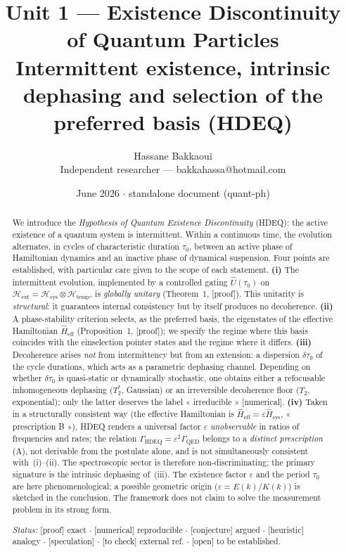 \documentclass[11pt,a4paper]{article}
\title{\textbf{Unit 1 --- Existence Discontinuity of Quantum Particles}\\[2pt]
\large Intermittent existence, intrinsic dephasing and selection of the preferred basis (HDEQ)}
\author{Hassane Bakkaoui\\ \small Independent researcher --- bakkahassa@hotmail.com}
\date{\small June 2026 $\cdot$ standalone document (quant-ph)}
\newcommand{\Hext}{\mathcal{H}_{\mathrm{ext}}}
\newcommand{\Hsys}{\mathcal{H}_{\mathrm{sys}}}
\newcommand{\Htemp}{\mathcal{H}_{\mathrm{temp}}}
\newcommand{\Hsysop}{\hat{H}_{\mathrm{sys}}}
\newcommand{\Heff}{\hat{H}_{\mathrm{eff}}}
\newcommand{\statut}[1]{{\footnotesize\textsf{[#1]}}}
\theoremstyle{plain}
\theoremstyle{definition}
\theoremstyle{remark}
\begin{document}
\maketitle

\begin{abstract}
\noindent
We introduce the \emph{Hypothesis of Quantum Existence Discontinuity} (HDEQ):
the active existence of a quantum system is intermittent. Within a continuous
time, the evolution alternates, in cycles of characteristic duration $\tau_0$,
between an active phase of Hamiltonian dynamics and an inactive phase of
dynamical suspension. Four points are established, with particular care given to
the scope of each statement.
\textbf{(i)} The intermittent evolution, implemented by a controlled gating
$\hat{U}(\tau_0)$ on $\Hext=\Hsys\otimes\Htemp$, is \emph{globally unitary}
(Theorem~1, \statut{proof}). This unitarity is \emph{structural}: it guarantees
internal consistency but by itself produces no decoherence.
\textbf{(ii)} A phase-stability criterion selects, as the preferred basis, the
eigenstates of the effective Hamiltonian $\Heff$ (Proposition~1, \statut{proof});
we specify the regime where this basis coincides with the einselection pointer
states and the regime where it differs.
\textbf{(iii)} Decoherence arises \emph{not} from intermittency but from an
extension: a dispersion $\delta\tau_0$ of the cycle durations, which acts as a
parametric dephasing channel. Depending on whether $\delta\tau_0$ is
quasi-static or dynamically stochastic, one obtains either a refocusable
inhomogeneous dephasing ($T_2^\ast$, Gaussian) or an irreversible decoherence
floor ($T_2$, exponential); only the latter deserves the label « irreducible »
\statut{numerical}.
\textbf{(iv)} Taken in a structurally consistent way (the effective Hamiltonian
is $\Heff=\varepsilon\Hsysop$, « prescription B »), HDEQ renders a universal
factor $\varepsilon$ \emph{unobservable} in ratios of frequencies and rates; the
relation $\Gamma_{\mathrm{HDEQ}}=\varepsilon^2\Gamma_{\mathrm{QED}}$ belongs to a
\emph{distinct prescription} (A), not derivable from the postulate alone, and is
not simultaneously consistent with~(i)--(ii). The spectroscopic sector is therefore
non-discriminating; the primary signature is the intrinsic dephasing of~(iii).
The existence factor $\varepsilon$ and the period $\tau_0$ are here
phenomenological; a possible geometric origin ($\varepsilon=E(k)/K(k)$) is
sketched in the conclusion. The framework does not claim to solve the measurement
problem in its strong form.
\par\smallskip
\noindent\textit{Status:} \statut{proof} exact $\cdot$ \statut{numerical} reproducible $\cdot$
\statut{conjecture} argued $\cdot$ \statut{heuristic} analogy $\cdot$
\statut{speculation} $\cdot$ \statut{to check} external ref. $\cdot$
\statut{open} to be established.
\end{abstract}
\end{document}
